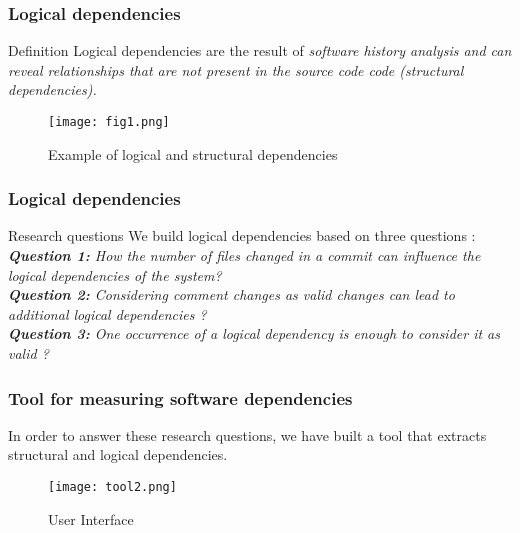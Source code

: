 \documentclass{beamer}
\begin{document}
 \begin{frame}
\frametitle{Logical dependencies}
\begin{block}{Definition}
 Logical dependencies are the result of \it{software history analysis} and can reveal relationships that are not present in the source code code (structural dependencies).
\end{block}

\begin{center}
     \begin{figure}
	\texttt{[image: fig1.png]}
	\caption{\label{fig:fig1}Example of logical and structural dependencies}
     \end{figure}
\end{center}

\end{frame}

 \begin{frame}
\frametitle{Logical dependencies}
\begin{block}{Research questions}
\vskip 0.3cm
We build logical dependencies based on three questions :\\
\textit{\textbf{Question 1:} How the number of files changed in a commit can influence the logical dependencies of the system?}\\
\textit{\textbf{Question 2:} Considering comment changes as valid changes can lead to additional logical dependencies ? }\\
\textit{\textbf{Question 3:} One occurrence of a logical dependency is enough to consider it as valid ?}\\
\end{block}
\end{frame}


 \begin{frame}
\frametitle{Tool for measuring software dependencies}
 In order to answer these research questions, we have built a tool that extracts structural and logical dependencies.
\begin{center}
     \begin{figure}
	\texttt{[image: tool2.png]}
	\caption{\label{fig:figtool} User Interface}
     \end{figure}
\end{center}

\end{frame}
\end{document}
